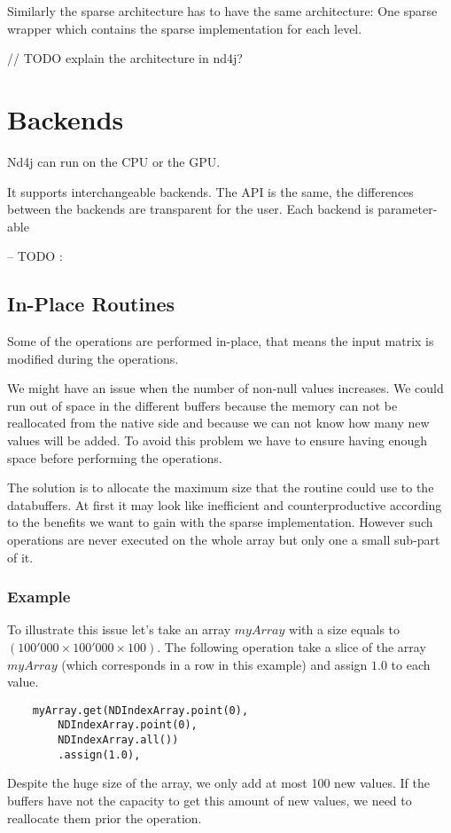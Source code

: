  Similarly the sparse architecture has to have the same architecture: One sparse wrapper which contains the sparse implementation for each level.
 
 // TODO explain the architecture in nd4j?
\section{Backends}

Nd4j can run on the CPU or the GPU. 

It supports interchangeable backends. The API is the same, the differences between the backends are transparent for the user.
Each backend is parameter-able 

-- TODO : 


\subsection{In-Place Routines}
Some of the operations are performed in-place, that means the input matrix is modified during the operations.

We might have an issue when the number of non-null values increases. We could run out of space in the different buffers because the memory can not be reallocated from the native side and because we can not know how many new values will be added. To avoid this problem we have to ensure having enough space before performing the operations.

The solution is to allocate the maximum size that the routine could use to the databuffers. At first it may look like inefficient and counterproductive according to the benefits we want to gain with the sparse implementation. However such operations are never executed on the whole array but only one a small sub-part of it.

\subsubsection{Example}
To illustrate this issue let's take an array $myArray$ with a size equals to $(100'000\times 100'000 \times 100)$. 
The following operation take a slice of the array $myArray$ (which corresponds in a row in this example) and assign $1.0$ to each value. 
\begin{lstlisting}
	myArray.get(NDIndexArray.point(0), 
		NDIndexArray.point(0), 
		NDIndexArray.all())
		.assign(1.0),
\end{lstlisting}
Despite the huge size of the array, we only add at most 100 new values. If the buffers have not the capacity to get this amount of new values, we need to reallocate them prior the operation.



